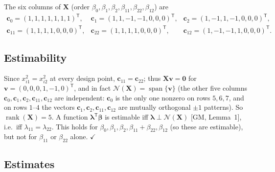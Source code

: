 \documentclass[11pt]{article}
\DeclareMathOperator{\rank}{rank}
\newcommand{\Ns}{\mathcal{N}}
\newcommand{\bX}{\mathbf{X}}
\newcommand{\bc}{\mathbf{c}}
\newcommand{\bv}{\mathbf{v}}
\newcommand{\bzero}{\mathbf{0}}
\newcommand{\bbeta}{\bm{\beta}}
\newcommand{\T}{^{\mathsf{T}}}
\theoremstyle{remark}
\begin{document}
The six columns of $\bX$ (order $\beta_0,\beta_1,\beta_2,\beta_{11},\beta_{22},\beta_{12}$) are
\[
\begin{array}{lll}
\bc_0=(1,1,1,1,1,1,1)\T, & \bc_1=(1,1,-1,-1,0,0,0)\T, & \bc_2=(1,-1,1,-1,0,0,0)\T,\\[2pt]
\bc_{11}=(1,1,1,1,0,0,0)\T, & \bc_{22}=(1,1,1,1,0,0,0)\T, & \bc_{12}=(1,-1,-1,1,0,0,0)\T.
\end{array}
\]

\subsection*{Estimability}

Since $x_{i1}^2=x_{i2}^2$ at every design point, $\bc_{11}=\bc_{22}$; thus $\bX\bv=\bzero$ for
$\bv=(0,0,0,1,-1,0)\T$, and in fact $\Ns(\bX)=\operatorname{span}\{\bv\}$ (the other five columns
$\bc_0,\bc_1,\bc_2,\bc_{11},\bc_{12}$ are independent: $\bc_0$ is the only one nonzero on rows $5,6,7$, and on
rows $1$--$4$ the vectors $\bc_1,\bc_2,\bc_{11},\bc_{12}$ are mutually orthogonal $\pm1$ patterns). So
$\rank(\bX)=5$. A function $\bm\lambda\T\bbeta$ is estimable iff $\bm\lambda\perp\Ns(\bX)$ [GM, Lemma~1],
i.e.\ iff $\lambda_{11}=\lambda_{22}$. This holds for $\beta_0,\beta_1,\beta_2,\beta_{11}+\beta_{22},
\beta_{12}$ (so these are estimable), but not for $\beta_{11}$ or $\beta_{22}$ alone. \hfill$\checkmark$

\subsection*{Estimates}
\end{document}
